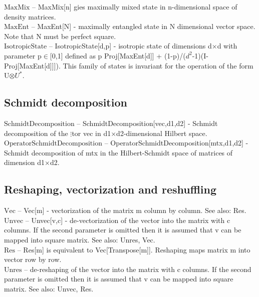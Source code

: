 \noindent\textbf{$ \text{MaxMix} $ }-- MaxMix[n] gies maximally mixed state in n-dimensional space of density matrices.$  $\\

\noindent\textbf{$ \text{MaxEnt} $ }-- MaxEnt[N] - maximally entangled state in N dimensional vector space. Note that N must be perfect square.$  $\\

\noindent\textbf{$ \text{IsotropicState} $ }-- IsotropicState[d,p] - isotropic state of dimensions d$\times $d with parameter p$\in $[0,1] defined as p Proj[MaxEnt[d]] + (1-p)/($ d^2 $-1)(I-Proj[MaxEnt[d]]]). This family of states is invariant for the operation of the form U$\otimes $$ U^*. $\\

\subsection{Schmidt decomposition}

\noindent\textbf{$ \text{SchmidtDecomposition} $ }-- SchmidtDecomposition[vec,d1,d2] - Schmidt decomposition of the $\vdots $tor vec in d1$\times $d2-dimensional Hilbert space.$  $\\

\noindent\textbf{$ \text{OperatorSchmidtDecomposition} $ }-- OperatorSchmidtDecomposition[mtx,d1,d2] - Schmidt decomposition of mtx in the Hilbert-Schmidt space of matrices of dimension d1$\times $d2.$  $\\

\subsection{Reshaping, vectorization and reshuffling}

\noindent\textbf{$ \text{Vec} $ }-- Vec[m] - vectorization of the matrix m column by column. See also: Res.$  $\\

\noindent\textbf{$ \text{Unvec} $ }-- Unvec[v,c] - de-vectorization of the vector into the matrix with c columns. If the second parameter is omitted then it is assumed that v can be mapped into square matrix. See also: Unres, Vec.$  $\\

\noindent\textbf{$ \text{Res} $ }-- Res[m] is equivalent to Vec[Transpose[m]]. Reshaping maps matrix m into vector row by row.$  $\\

\noindent\textbf{$ \text{Unres} $ }-- de-reshaping of the vector into the matrix with c columns. If the second parameter is omitted then it is assumed that v can be mapped into square matrix. See also: Unvec, Res.$  $\\

